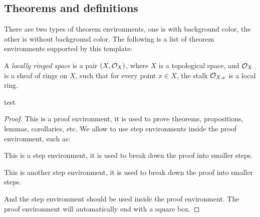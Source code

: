 \subsection{Theorems and definitions}\label{subsec:theorems_and_definitions}
    
    There are two types of theorem environments, one is with background color, the other is without background color. 
    The following is a list of theorem environments supported by this template:

    \begin{definition}
        A \emph{locally ringed space} is a pair \((X, {\mathcal{O}}_X)\), where \(X\) is a topological space, and \({\mathcal{O}}_X\) is a sheaf of rings on \(X\), such that for every point \(x \in X\), the stalk \({\mathcal{O}}_{X,x}\) is a local ring.
    \end{definition}
    \begin{proposition}
        test 
    \end{proposition}
    \begin{proof}
        This is a proof environment, it is used to prove theorems, propositions, lemmas, corollaries, etc.
        We allow to use step environments inside the proof environment, such as:
        \begin{step}\label{step:1_in_proof_1}
            This is a step environment, it is used to break down the proof into smaller steps.
        \end{step}
        \begin{step}\label{step:2_in_proof_1}
            This is another step environment, it is used to break down the proof into smaller steps.
        \end{step}
        And the step environment should be used inside the proof environment.
        The proof environment will automatically end with a square box.
    \end{proof}
    
